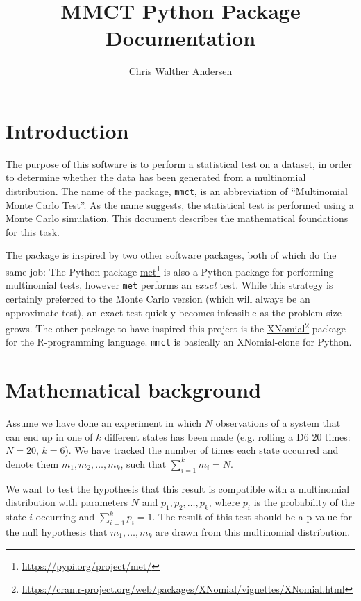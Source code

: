 \documentclass{ol-softwaremanual}
\title{MMCT Python Package \\ Documentation}
\author{Chris Walther Andersen}
\newcommand{\doclink}[2]{\href{#1}{#2}\footnote{\url{#1}}}
\newcommand{\mmct}{\texttt{mmct}}
\begin{document}
\maketitle

\section{Introduction}

The purpose of this software is to perform a statistical test on a dataset, in 
order to determine whether the data has been generated from a multinomial 
distribution. The name of the package, \mmct{}, is an abbreviation of 
\enquote{Multinomial Monte Carlo Test}. As the name suggests, the statistical 
test is performed using a Monte Carlo simulation. This document describes the 
mathematical foundations for this task.

The package is inspired by two other software packages, both of which do the 
same job:
The Python-package \doclink{https://pypi.org/project/met/}{met} is also a 
Python-package for performing multinomial tests, however \texttt{met} performs 
an \emph{exact} test. While this strategy is certainly preferred to the Monte 
Carlo version (which will always be an approximate test), an exact test quickly 
becomes infeasible as the problem size grows. The other package to have 
inspired this project is the 
\doclink{https://cran.r-project.org/web/packages/XNomial/vignettes/XNomial.html}{XNomial}
package for the R-programming language. \mmct{} is basically an XNomial-clone 
for 
Python.



\section{Mathematical background}

Assume we have done an experiment in which $N$ observations of a system that 
can end up in one of $k$ different states has been made (e.g. rolling a D6 20 
times: $N=20$, $k=6$). We have tracked the number of times each state occurred 
and denote them $m_1, m_2, \ldots, m_k$, such that $\sum_{i=1}^k m_i = N$.

We want to test the hypothesis that this result is compatible with a 
multinomial distribution with parameters $N$ and $p_1, p_2, \ldots, p_k$, where 
$p_i$ is the probability of the state $i$ occurring and $\sum_{i=1}^k p_i = 
1$. The result of this test should be a p-value for the null hypothesis that 
$m_1, \ldots, m_k$ are drawn from this multinomial distribution.
\end{document}
